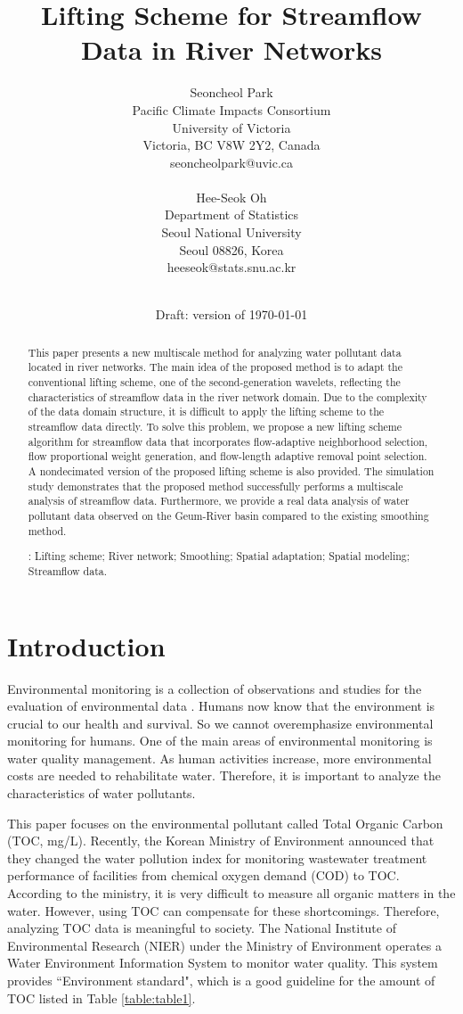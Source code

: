 \documentclass[11pt,titlepage]{article}
\title{\bf Lifting Scheme for Streamflow Data in River Networks
\medskip
}
\author{
Seoncheol Park \\
Pacific Climate Impacts Consortium\\
University of Victoria\\
Victoria, BC V8W 2Y2, Canada\\
seoncheolpark@uvic.ca\\
\\
Hee-Seok Oh \\
Department of Statistics\\
Seoul National University\\
Seoul 08826, Korea\\
heeseok@stats.snu.ac.kr\\
\\
}
\date{Draft: version of \today}
\begin{document}
\maketitle


\begin{abstract}
This paper presents a new multiscale method for analyzing water pollutant data located in river networks. The main idea of the proposed method is to adapt the conventional lifting scheme, one of the second-generation wavelets, reflecting the characteristics of streamflow data in the river network domain. Due to the complexity of the data domain structure, it is difficult to apply the lifting scheme to the streamflow data directly. To solve this problem, we propose a new lifting scheme algorithm for streamflow data that incorporates flow-adaptive neighborhood selection, flow proportional weight generation, and flow-length adaptive removal point selection. A nondecimated version of the proposed lifting scheme is also provided. The simulation study demonstrates that the proposed method successfully performs a multiscale analysis of streamflow data. Furthermore, we provide a real data analysis of water pollutant data observed on the Geum-River basin compared to the existing smoothing method. 

\vskip 7mm

: Lifting scheme; River network; Smoothing; Spatial adaptation; Spatial modeling; Streamflow data. 

\end{abstract}

\section{Introduction}\label{sec:intro}

Environmental monitoring is a collection of observations and studies for the evaluation of environmental data \citep{Artiola2004}. Humans now know that the environment is crucial to our health and survival. So we cannot overemphasize environmental monitoring for humans. One of the main areas of environmental monitoring is water quality management. As human activities increase, more environmental costs are needed to rehabilitate water. Therefore, it is important to analyze the characteristics of water pollutants. 

This paper focuses on the environmental pollutant called Total Organic Carbon (TOC, mg/L). Recently, the Korean Ministry of Environment announced that they changed the water pollution index for monitoring wastewater treatment performance of facilities from chemical oxygen demand (COD) to TOC. According to the ministry, it is very difficult to measure all organic matters in the water. However, using TOC can compensate for these shortcomings. Therefore, analyzing TOC data is meaningful to society.  The National Institute of Environmental Research (NIER) under the Ministry of Environment operates a Water Environment Information System to monitor water quality. This system provides ``Environment standard", which is a good guideline for the amount of TOC listed in Table \ref{table:table1}.
\end{document}
